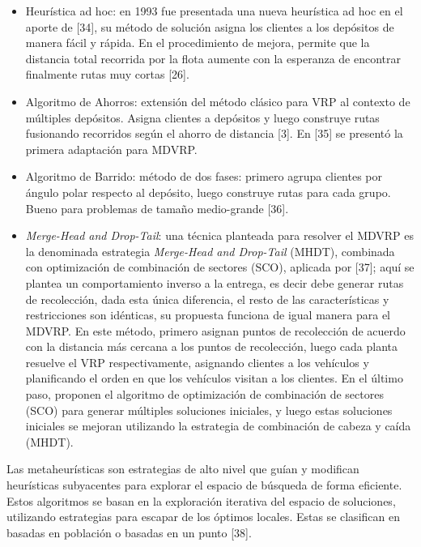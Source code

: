 \begin{itemize}
  \item Heur\'istica ad hoc: en 1993 fue presentada una nueva heur\'istica ad hoc en el aporte de [34], su m\'etodo de soluci\'on asigna los clientes a los dep\'ositos de manera f\'acil y r\'apida. En el procedimiento de mejora, permite que la distancia total recorrida por la flota aumente con la esperanza de encontrar finalmente rutas muy cortas [26].
  \item Algoritmo de Ahorros: extensi\'on del m\'etodo cl\'asico para VRP al contexto de m\'ultiples dep\'ositos. Asigna clientes a dep\'ositos y luego construye rutas fusionando recorridos seg\'un el ahorro de distancia [3]. En [35] se present\'o la primera adaptaci\'on para MDVRP.
  \item Algoritmo de Barrido: m\'etodo de dos fases: primero agrupa clientes por \'angulo polar respecto al dep\'osito, luego construye rutas para cada grupo. Bueno para problemas de tama\~no medio-grande [36].
  \item \textit{Merge-Head and Drop-Tail}: una t\'ecnica planteada para resolver el MDVRP es la denominada estrategia \textit{Merge-Head and Drop-Tail} (MHDT), combinada con optimizaci\'on de combinaci\'on de sectores (SCO), aplicada por [37]; aqu\'i se plantea un comportamiento inverso a la entrega, es decir debe generar rutas de recolecci\'on, dada esta \'unica diferencia, el resto de las caracter\'isticas y restricciones son id\'enticas, su propuesta funciona de igual manera para el MDVRP. En este m\'etodo, primero asignan puntos de recolecci\'on de acuerdo con la distancia m\'as cercana a los puntos de recolecci\'on, luego cada planta resuelve el VRP respectivamente, asignando clientes a los veh\'iculos y planificando el orden en que los veh\'iculos visitan a los clientes. En el \'ultimo paso, proponen el algoritmo de optimizaci\'on de combinaci\'on de sectores (SCO) para generar m\'ultiples soluciones iniciales, y luego estas soluciones iniciales se mejoran utilizando la estrategia de combinaci\'on de cabeza y ca\'ida (MHDT).
\end{itemize}

Las metaheur\'isticas son estrategias de alto nivel que gu\'ian y modifican heur\'isticas subyacentes para explorar el espacio de b\'usqueda de forma eficiente. Estos algoritmos se basan en la exploraci\'on iterativa del espacio de soluciones, utilizando estrategias para escapar de los \'optimos locales. Estas se clasifican en basadas en poblaci\'on o basadas en un punto [38].

